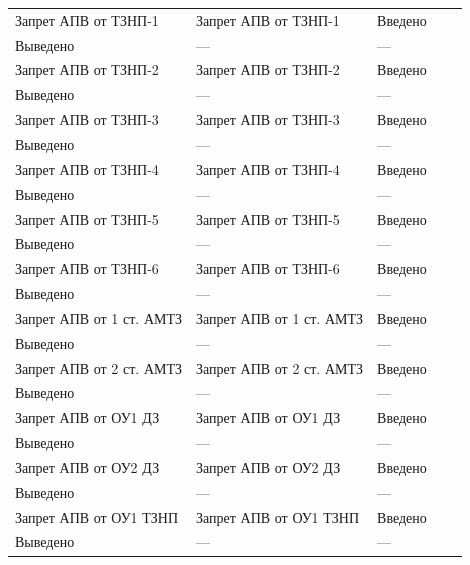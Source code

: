 \begin{longtable}{|>{\centering\arraybackslash}m{5.3cm}|>{\centering\arraybackslash}m{3.3cm}|>{\centering\arraybackslash}m{4.2cm}|>{\centering\arraybackslash}m{1.8cm}|>{\centering\arraybackslash}m{1cm}|}
\hline
\raggedright Запрет АПВ от ТЗНП-1 & \centering Запрет АПВ от ТЗНП-1 & \centering Введено \\ Выведено & \centering --- & \centering \arraybackslash --- \\
\hline
\raggedright Запрет АПВ от ТЗНП-2 & \centering Запрет АПВ от ТЗНП-2 & \centering Введено \\ Выведено & \centering --- & \centering \arraybackslash --- \\
\hline
\raggedright Запрет АПВ от ТЗНП-3 & \centering Запрет АПВ от ТЗНП-3 & \centering Введено \\ Выведено & \centering --- & \centering \arraybackslash --- \\
\hline
\raggedright Запрет АПВ от ТЗНП-4 & \centering Запрет АПВ от ТЗНП-4 & \centering Введено \\ Выведено & \centering --- & \centering \arraybackslash --- \\
\hline
\raggedright Запрет АПВ от ТЗНП-5 & \centering Запрет АПВ от ТЗНП-5 & \centering Введено \\ Выведено & \centering --- & \centering \arraybackslash --- \\
\hline
\raggedright Запрет АПВ от ТЗНП-6 & \centering Запрет АПВ от ТЗНП-6 & \centering Введено \\ Выведено & \centering --- & \centering \arraybackslash --- \\
\hline
\raggedright Запрет АПВ от 1 ст. АМТЗ & \centering Запрет АПВ от 1 ст. АМТЗ & \centering Введено \\ Выведено & \centering --- & \centering \arraybackslash --- \\
\hline
\raggedright Запрет АПВ от 2 ст. АМТЗ & \centering Запрет АПВ от 2 ст. АМТЗ & \centering Введено \\ Выведено & \centering --- & \centering \arraybackslash --- \\
\hline
\raggedright Запрет АПВ от ОУ1 ДЗ & \centering Запрет АПВ от ОУ1 ДЗ & \centering Введено \\ Выведено & \centering --- & \centering \arraybackslash --- \\
\hline
\raggedright Запрет АПВ от ОУ2 ДЗ & \centering Запрет АПВ от ОУ2 ДЗ & \centering Введено \\ Выведено & \centering --- & \centering \arraybackslash --- \\
\hline
\raggedright Запрет АПВ от ОУ1 ТЗНП & \centering Запрет АПВ от ОУ1 ТЗНП & \centering Введено \\ Выведено & \centering --- & \centering \arraybackslash --- \\

\end{longtable}
